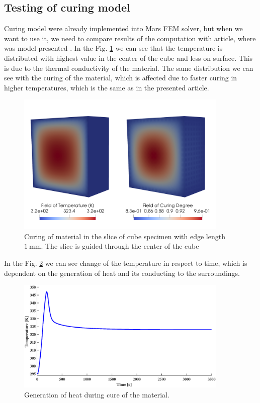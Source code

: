 \clearpage
\subsection{Testing of curing model}
\indent

Curing model were already implemented into Mars FEM solver, but when we want to use it, we need to compare results of the computation with article, where was model presented \cite{heinrich2012generation}. In the Fig. \ref{obr:Curing_cube} we can see that the temperature is distributed with highest value in the center of the cube and less on surface. This is due to the thermal conductivity of the material. The same distribution we can see with the curing of the material, which is affected due to faster curing in higher temperatures, which is the same as in the presented article. 

\begin{figure}[h!]
	\centering
	\includegraphics[width=0.9\textwidth]{obrazky/curing__and_temperature.png}
	\caption[Curing of material]{Curing of material in the slice of cube specimen with edge length $1~\mathrm{mm}$. The slice is guided through the center of the cube }\label{obr:Curing_cube}
\end{figure}


In the Fig. \ref{obr:Curing_temperature} we can see change of the temperature in respect to time, which is dependent on the generation of heat and its conducting to the surroundings. 

\begin{figure}[h!]
	\centering
	\includegraphics[width=0.9\textwidth]{obrazky/T-t.eps}
	\caption[Generation of heat during cure]{Generation of heat during cure of the material.}\label{obr:Curing_temperature}
\end{figure}

